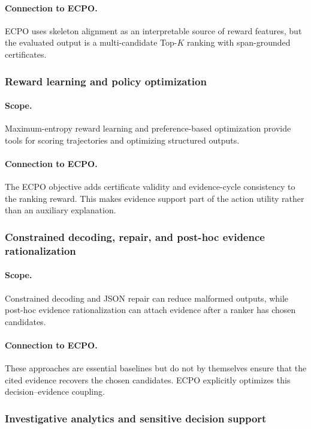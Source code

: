 \documentclass{article}
\begin{document}
\paragraph{Connection to ECPO.}
ECPO uses skeleton alignment as an interpretable source of reward features, but the evaluated output is a multi-candidate Top-$K$ ranking with span-grounded certificates.

\subsubsection{Reward learning and policy optimization}
\paragraph{Scope.}
Maximum-entropy reward learning and preference-based optimization provide tools for scoring trajectories and optimizing structured outputs.
\paragraph{Connection to ECPO.}
The ECPO objective adds certificate validity and evidence-cycle consistency to the ranking reward. This makes evidence support part of the action utility rather than an auxiliary explanation.

\subsubsection{Constrained decoding, repair, and post-hoc evidence rationalization}
\paragraph{Scope.}
Constrained decoding and JSON repair can reduce malformed outputs, while post-hoc evidence rationalization can attach evidence after a ranker has chosen candidates.
\paragraph{Connection to ECPO.}
These approaches are essential baselines but do not by themselves ensure that the cited evidence recovers the chosen candidates. ECPO explicitly optimizes this decision--evidence coupling.

\subsubsection{Investigative analytics and sensitive decision support}
\end{document}
